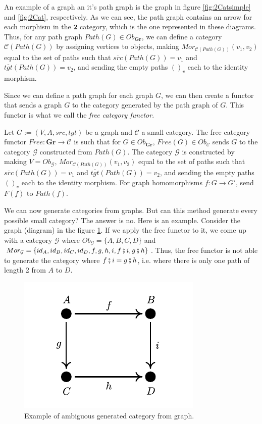 An example of a graph an it's path graph is the graph in figure \ref{fig:2Catsimple}
and \ref{fig:2Cat}, respectively. As we can see, the path graph contains an arrow for each
morphism in the $\mathbf{2}$ category, which is the one represented in these diagrams.
Thus, for any path graph $Path(G) \in Ob_\mathbf{Gr}$, we can define a category
$\mathcal C(Path(G))$ by assigning vertices to objects,
making $Mor_{\mathcal C(Path(G))}(v_1,v_2)$ equal to the set of paths such that
$\overline{src}(Path(G)) = v_1$ and $\overline{tgt}(Path(G)) = v_2$, and sending
the empty paths $()_v$ each to the identity morphism.

Since we can define a path graph for each graph $G$, we can then create a functor
that sends a graph $G$ to the category generated by the path graph of $G$. This
functor is what we call the \textit{free category functor}.

\begin{definition}
  Let $G:=(V, A, src, tgt)$ be a graph and $\mathcal C$ a small category. The
  free category functor $Free:\mathbf{Gr} \to \mathcal C$ is such that for
  $G \in Ob_{\mathbf{Gr}}$, $Free(G) \in Ob_{\mathcal C}$ sends $G$ to the
  category $\mathcal G$ constructed from $Path(G)$.
  The category $\mathcal G$ is constructed by making $V = Ob_\mathcal G$,
  $Mor_{\mathcal C(Path(G))}(v_1,v_2)$ equal to the set of paths such that
  $\overline{src}(Path(G)) = v_1$ and $\overline{tgt}(Path(G)) = v_2$, and sending
  the empty paths $()_v$ each to the identity morphism.
  For graph homomorphisms $f:G\to G'$, send $F(f)$ to $Path(f)$.
\end{definition}

We can now generate categories from graphs. But can this method generate
every possible small category? The answer is no. Here is an example.
Consider the graph (diagram) in the figure \ref{fig:Square}.
If we apply the free functor to it, we come up with a category $\mathcal G$
where $Ob_\mathcal G = \{A,B,C,D\}$ and $Mor_\mathcal G = \{id_A,id_B,id_C,id_D, f,g,h,i, f \fatsemi i, g \fatsemi h\}$.
Thus, the free functor is not able to generate the category where $f \fatsemi i = g \fatsemi h$, i.e.
where there is only one path of length 2 from $A$ to $D$.

\begin{figure}[H]
  \begin{center}
    \includegraphics{./notebooks/SquareGraph.pdf}
  \end{center}
  \caption{Example of ambiguous generated category from graph.}
  \label{fig:Square}
\end{figure}


